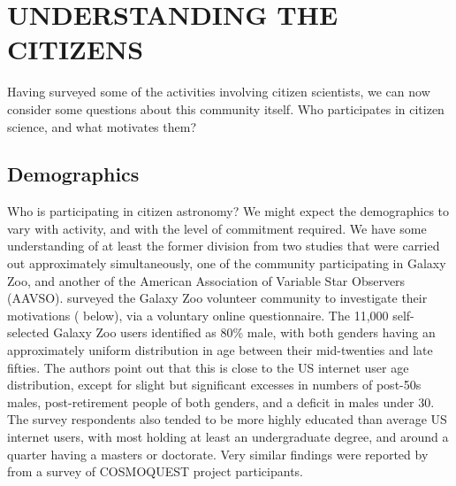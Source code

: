 \documentclass{ar2e}
\begin{document}


% 




\section{UNDERSTANDING THE CITIZENS}
\label{sec:crowd}

Having surveyed some of the activities involving citizen scientists, we can
now consider some questions about this community itself. Who participates in
citizen science, and what motivates them?



\subsection{Demographics}
\label{sec:crowd:demographics}

Who is participating in citizen astronomy? We might expect the demographics to
vary with activity, and with the level of commitment required. We have some
understanding of at least the former division from two studies that were
carried out approximately simultaneously, one of the community  participating
in Galaxy Zoo, and another of the American Association of Variable Star
Observers (AAVSO).  \citet{Rad++2013} surveyed the Galaxy Zoo volunteer
community to investigate their motivations (
below), via a voluntary online questionnaire. The 11,000 self-selected Galaxy
Zoo users identified as 80\% male, with both genders having an approximately
uniform distribution in age between their mid-twenties and late fifties. The
authors point out that this is close to the US internet user age distribution,
except for slight but significant excesses in numbers of post-50s males,
post-retirement people of both genders, and a deficit in males under 30. The
survey respondents  also tended to be more highly educated than average US
internet users, with most holding at least an undergraduate degree, and around
a quarter having a masters or doctorate. Very similar findings were reported
by \citet{COSMOQUESTsurvey} from a survey of COSMOQUEST project participants.
\end{document}
